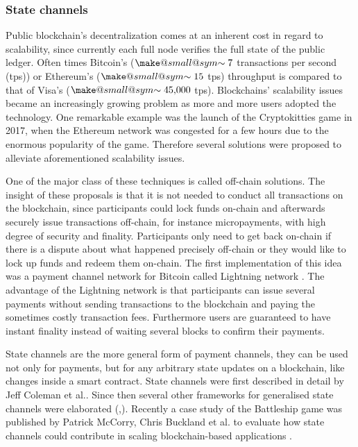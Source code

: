 \documentclass[a4paper]{article}
\makeatletter
\theoremstyle{definition}
\newcommand{\smallsim}{\smallsym{\mathrel}{\sim}}
\newcommand{\smallsym}[2]{#1{\mathpalette\make@small@sym{#2}}}
\newcommand{\make@small@sym}[2]{%
	\vcenter{\hbox{$\m@th\downgrade@style#1#2$}}%
}
\newcommand{\downgrade@style}[1]{%
	\ifx#1\displaystyle\scriptstyle\else
	\ifx#1\textstyle\scriptstyle\else
	\scriptscriptstyle
	\fi\fi
}
\makeatother
\begin{document}
\subsubsection{State channels} 
Public blockchain's decentralization comes at an inherent cost in regard to scalability, since currently each full node verifies the full state of the public ledger. Often times Bitcoin's ($\smallsim7$ transactions per second (tps)) or Ethereum's ($\smallsim15$ tps) throughput is compared to that of Visa's ($\smallsim\num[group-separator={,}]{45000}$ tps). Blockchains' scalability issues became an increasingly growing problem as more and more users adopted the technology. One remarkable example was the launch of the Cryptokitties game in 2017, when the Ethereum network was congested for a few hours due to the enormous popularity of the game. Therefore several solutions were proposed to alleviate aforementioned scalability issues.

One of the major class of these techniques is called off-chain solutions. The insight of these proposals is that it is not needed to conduct all transactions on the blockchain, since participants could lock funds on-chain and afterwards securely issue transactions off-chain, for instance micropayments, with high degree of security and finality. Participants only need to get back on-chain if there is a dispute about what happened precisely off-chain or they would like to lock up funds and redeem them on-chain. The first implementation of this idea was a payment channel network for Bitcoin called Lightning network \cite{poon2016bitcoin}. The advantage of the Lightning network is that participants can issue several payments without sending transactions to the blockchain and paying the sometimes costly transaction fees. Furthermore users are guaranteed to have instant finality instead of waiting several blocks to confirm their payments. 

State channels are the more general form of payment channels, they can be used not only for payments, but for any arbitrary state updates on a blockchain, like changes inside a smart contract. State channels were first described in detail by Jeff Coleman et al.\cite{coleman2018counterfactual}. Since then several other frameworks for generalised state channels were elaborated (\cite{dziembowski2017perun},\cite{mccorryyou}). Recently a case study of the Battleship game was published by Patrick McCorry, Chris Buckland et al. to evaluate how state channels could contribute in scaling blockchain-based applications \cite{mccorryyou}.  
\end{document}
